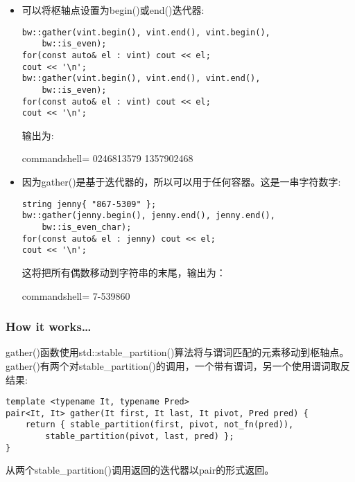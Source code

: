 \begin{itemize}
gather()函数返回一对只包含偶数值的迭代器:

\begin{lstlisting}[style=styleCXX]
auto& [it1, it2] = gathered_even;
for(auto it{ it1 }; it < it2; ++it) cout << *it;
cout << '\n';
\end{lstlisting}

输出为:

\begin{tcblisting}{commandshell={}}
02468
\end{tcblisting}

\item 
可以将枢轴点设置为begin()或end()迭代器:

\begin{lstlisting}[style=styleCXX]
bw::gather(vint.begin(), vint.end(), vint.begin(),
	bw::is_even);
for(const auto& el : vint) cout << el;
cout << '\n';
bw::gather(vint.begin(), vint.end(), vint.end(),
	bw::is_even);
for(const auto& el : vint) cout << el;
cout << '\n';
\end{lstlisting}

输出为:

\begin{tcblisting}{commandshell={}}
0246813579
1357902468
\end{tcblisting}

\item 
因为gather()是基于迭代器的，所以可以用于任何容器。这是一串字符数字:

\begin{lstlisting}[style=styleCXX]
string jenny{ "867-5309" };
bw::gather(jenny.begin(), jenny.end(), jenny.end(),
	bw::is_even_char);
for(const auto& el : jenny) cout << el;
cout << '\n';
\end{lstlisting}

这将把所有偶数移动到字符串的末尾，输出为：

\begin{tcblisting}{commandshell={}}
7-539860
\end{tcblisting}

\end{itemize}

\subsubsection{How it works…}

gather()函数使用std::stable\_partition()算法将与谓词匹配的元素移动到枢轴点。gather()有两个对stable\_partition()的调用，一个带有谓词，另一个使用谓词取反结果:

\begin{lstlisting}[style=styleCXX]
template <typename It, typename Pred>
pair<It, It> gather(It first, It last, It pivot, Pred pred) {
	return { stable_partition(first, pivot, not_fn(pred)),
		stable_partition(pivot, last, pred) };
}
\end{lstlisting}

从两个stable\_partition()调用返回的迭代器以pair的形式返回。










